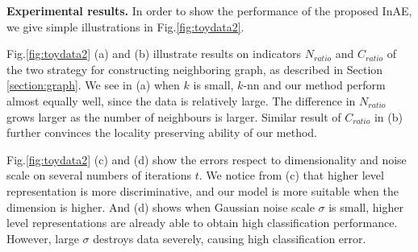 \documentclass{article}
\begin{document}
{\bf Experimental results.}
In order to show the performance of the proposed InAE,
we give simple illustrations in Fig.\ref{fig:toydata2}.

Fig.\ref{fig:toydata2} (a) and (b) illustrate results on indicators $N_{ratio}$ and $C_{ratio}$ of the two strategy for constructing neighboring graph, as described in Section \ref{section:graph}.
We see in (a) when $k$ is small,
$k$-nn and our method perform almost equally well,
since the data is relatively large.
The difference in $N_{ratio}$ grows larger as the number of neighbours is larger.
Similar result of $C_{ratio}$ in (b) further convinces the locality preserving ability of our method.

Fig.\ref{fig:toydata2} (c) and (d) show the errors
respect to dimensionality and noise scale on several numbers of iterations $t$.
We notice from (c) that
higher level representation is more discriminative,
and our model is more suitable when the dimension is higher.
And (d) shows when Gaussian noise scale $\sigma$ is small,
higher level representations are already able to obtain high classification performance.
However,
large $\sigma$ destroys data severely,
causing high classification error.
\end{document}
